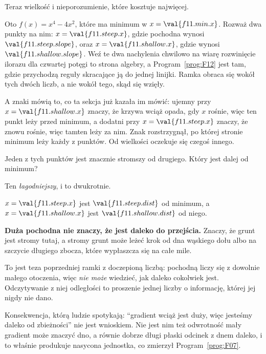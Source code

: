 \begin{fr}
Teraz wielkość i nieporozumienie, które kosztuje najwięcej.

Oto $f(x) = x^{4} - 4x^{2}$, które ma minimum w $x = \val{f11.min.x}$. Rozważ
dwa punkty na nim: $x = \val{f11.steep.x}$, gdzie pochodna wynosi
$\val{f11.steep.slope}$, oraz $x = \val{f11.shallow.x}$, gdzie wynosi
$\val{f11.shallow.slope}$. Weź te dwa nachylenia chwilowo na wiarę \dash{}
rozwinięcie ilorazu dla czwartej potęgi to strona algebry, a
Program~\ref{prog:F12} jest tam, gdzie przychodzą reguły skracające ją do
jednej linijki. Ramka obraca się wokół tych dwóch liczb, a nie wokół tego,
skąd się wzięły.

A znaki mówią to, co ta sekcja już kazała im mówić: ujemny przy
$x = \val{f11.shallow.x}$ znaczy, że krzywa wciąż opada, gdy $x$ rośnie, więc
ten punkt leży przed minimum, a dodatni przy $x = \val{f11.steep.x}$ znaczy, że
znowu rośnie, więc tamten leży za nim. Znak rozstrzygnął, po której stronie
minimum leży każdy z punktów. Od wielkości oczekuje się czegoś innego.

Jeden z tych punktów jest znacznie stromszy od drugiego. Który jest dalej od
minimum?
\dotline
\nextframe
\end{fr}

\begin{fr}
\begin{ansblock}
Ten \emph{łagodniejszy}, i to dwukrotnie.
\end{ansblock}

$x = \val{f11.steep.x}$ jest $\val{f11.steep.dist}$ od minimum, a
$x = \val{f11.shallow.x}$ jest $\val{f11.shallow.dist}$ od niego.

\begin{trapbox}
\textbf{Duża pochodna nie znaczy, że jest daleko do przejścia.} Znaczy, że
grunt jest stromy tutaj, a stromy grunt może leżeć krok od dna wąskiego dołu
albo na szczycie długiego zbocza, które wypłaszcza się na całe mile.

To jest teza poprzedniej ramki z doczepioną liczbą: pochodną liczy się z
dowolnie małego otoczenia, więc \emph{nie może} wiedzieć, jak daleko cokolwiek
jest. Odczytywanie z niej odległości to proszenie jednej liczby o informację,
której jej nigdy nie dano.

Konsekwencja, którą ludzie spotykają: \enquote{gradient wciąż jest duży, więc
jesteśmy daleko od zbieżności} nie jest wnioskiem. Nie jest nim też
odwrotność \dash{} mały gradient może znaczyć dno, a równie dobrze długi
płaski odcinek z dnem daleko, i to właśnie produkuje nasycona jednostka, co
zmierzył Program~\ref{prog:F07}.
\end{trapbox}

\end{fr}

